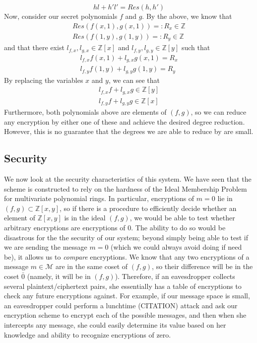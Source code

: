 \documentclass[11pt]{report}
\newcommand{\Z}{\mathbb{Z}}
\newcommand{\M}{\mathcal{M}}
\newcommand{\Zx}{\mathbb{Z}[x]}
\newcommand{\Zy}{\mathbb{Z}[y]}
\newcommand{\Zxy}{\mathbb{Z}[x,y]}
\begin{document}
\[hl+h'l' = Res(h,h') \]
Now, consider our secret polynomials $f$ and $g$. By the above, we know that
\begin{align*}
Res(f(x,1),g(x,1)) =: R_x \in \Z\\
Res(f(1,y),g(1,y)) =: R_y \in \Z
\end{align*}
and that there exist $l_{f,x}, l_{g,x}\in \Zx$ and $l_{f,y}, l_{g,y}\in \Zy$ such that
\begin{align*}
l_{f,x}f(x,1)+l_{g,x}g(x,1) = R_x\\
l_{f,y}f(1,y)+l_{g,y}g(1,y) = R_y
\end{align*}
By replacing the variables $x$ and $y$, we can see that
\begin{align*}
l_{f,x}f+l_{g,x}g \in \Zy\\
l_{f,y}f+l_{g,y}g \in \Zx
\end{align*}
Furthermore, both polynomials above are elements of $(f,g)$, so we can reduce any encryption by either one of these and achieve the desired degree reduction. However, this is no guarantee that the degrees we are able to reduce by are small.


\subsection{Security}
\label{sec:mv_security}
We now look at the security characteristics of this system. We have seen that the scheme is constructed to rely on the hardness of the Ideal Membership Problem for multivariate polynomial rings. In particular, encryptions of $m=0$ lie in $(f,g)\subset \Zxy$, so if there is a procedure to efficiently decide whether an element of $\Zxy$ is in the ideal $(f,g)$, we would be able to test whether arbitrary encryptions are encryptions of $0$. The ability to do so would be disastrous for the the security of our system; beyond simply being able to test if we are sending the message $m=0$ (which we could always avoid doing if need be), it allows us to \emph{compare} encryptions. We know that any two encryptions of a message $m\in \M$ are in the same coset of $(f,g)$, so their difference will be in the coset $\bar{0}$ (namely, it will be in $(f,g)$). Therefore, if an eavesdropper collects several plaintext/ciphertext pairs, she essentially has a table of encryptions to check any future encryptions against. For example, if our message space is small, an eavesdropper could perform a lunchtime (CITATION) attack and ask our encryption scheme to encrypt each of the possible messages, and then when she intercepts any message, she could easily determine its value based on her knowledge and ability to recognize encryptions of zero.
\end{document}
